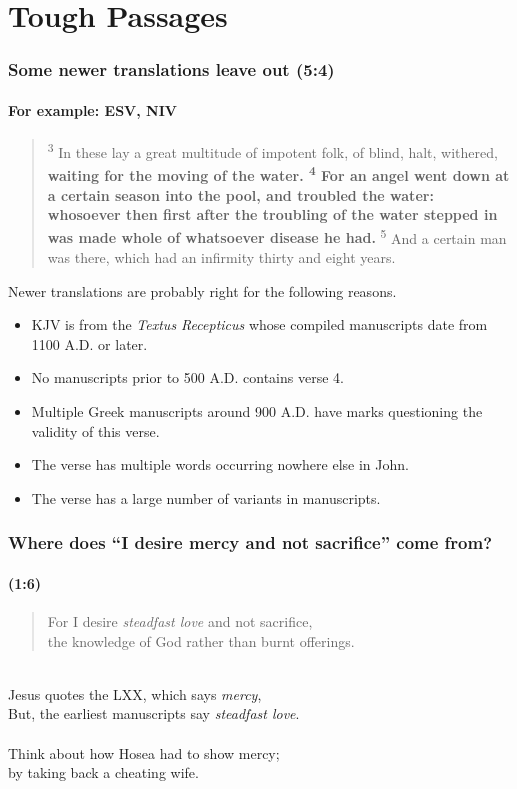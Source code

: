 \section*{Tough Passages}
\begin{frame}
\frametitle{Some newer translations leave out (5:4)}
\framesubtitle{For example: ESV, NIV}

\footnotesize  
\begin{quote}
\textsuperscript{3} In these lay a great multitude of impotent folk, of blind, halt, withered, \textbf{waiting for the moving of the water. \textsuperscript{4} For an angel went down at a certain season into the pool, and troubled the water: whosoever then first after the troubling of the water stepped in was made whole of whatsoever disease he had.} \textsuperscript{5} And a certain man was there, which had an infirmity thirty and eight years.

\end{quote}
\normalsize 
Newer translations are probably right for the following reasons.
\begin{itemize}
\item KJV is from the \textit{Textus Recepticus} whose compiled manuscripts date from 1100 A.D. or later.
\item No manuscripts prior to 500 A.D. contains verse 4.
\item Multiple Greek manuscripts around 900 A.D. have marks questioning the validity of this verse.
\item The verse has multiple words occurring nowhere else in John.
\item The verse has a large number of variants in manuscripts.
\end{itemize}

\end{frame}

\begin{frame}
\frametitle{Where does ``I desire mercy and not sacrifice'' come from?}
\framesubtitle{(1:6)}
\begin{verse}
For I desire \emph{steadfast love} and not sacrifice,\\
the knowledge of God rather than burnt offerings.\\
\end{verse}~\\
Jesus quotes the LXX, which says \emph{mercy},\\
But, the earliest manuscripts say \emph{steadfast love}.\\~\\
Think about how Hosea had to show mercy;\\
by taking back a cheating wife.
\end{frame}

